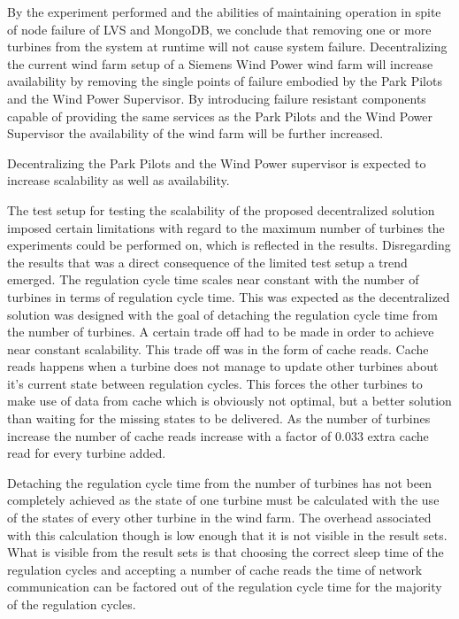 By the experiment performed and the abilities of maintaining operation in spite of node failure of LVS and MongoDB, we conclude that removing one or more turbines from the system at runtime will not cause system failure. Decentralizing the current wind farm setup of a Siemens Wind Power wind farm will increase availability by removing the single points of failure embodied by the Park Pilots and the Wind Power Supervisor. By introducing failure resistant components capable of providing the same services as the Park Pilots and the Wind Power Supervisor the availability of the wind farm will be further increased.

Decentralizing the Park Pilots and the Wind Power supervisor is expected to increase scalability as well as availability.

The test setup for testing the scalability of the proposed decentralized solution imposed certain limitations with regard to the maximum number of turbines the experiments could be performed on, which is reflected in the results. Disregarding the results that was a direct consequence of the limited test setup a trend emerged. The regulation cycle time scales near constant with the number of turbines in terms of regulation cycle time. This was expected as the decentralized solution was designed with the goal of detaching the regulation cycle time from the number of turbines. A certain trade off had to be made in order to achieve near constant scalability. This trade off was in the form of cache reads. Cache reads happens when a turbine does not manage to update other turbines about it's current state between regulation cycles. This forces the other turbines to make use of data from cache which is obviously not optimal, but a better solution than waiting for the missing states to be delivered. As the number of turbines increase the number of cache reads increase with a factor of 0.033 extra cache read for every turbine added.

Detaching the regulation cycle time from the number of turbines has not been completely achieved as the state of one turbine must be calculated with the use of the states of every other turbine in the wind farm. The overhead associated with this calculation though is low enough that it is not visible in the result sets. What is visible from the result sets is that choosing the correct sleep time of the regulation cycles and accepting a number of cache reads the time of network communication can be factored out of the regulation cycle time for the majority of the regulation cycles.


